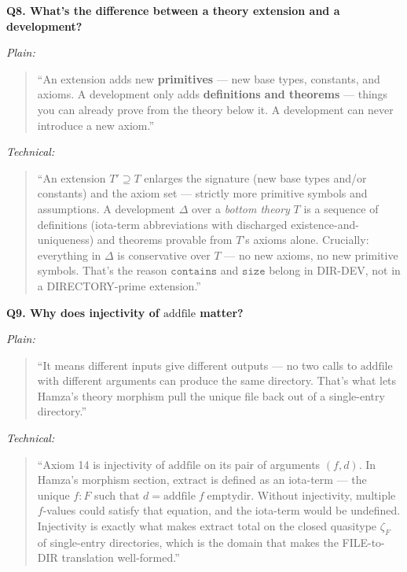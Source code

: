 \documentclass[12pt]{article}
\newenvironment{say}{%
  \par\medskip%
  \begin{quote}%
  \setlength{\parskip}{0.7em}%
  \large\itshape%
}{%
  \end{quote}%
  \medskip%
}
\begin{document}
\vspace{0.8em}
\textbf{\color{slidebar}Q8. What's the difference between a theory extension and a development?}

\textit{\color{pauseclr}Plain:}
\begin{say}
``An extension adds new \textbf{primitives} --- new base types, constants, and axioms. A development only adds \textbf{definitions and theorems} --- things you can already prove from the theory below it. A development can never introduce a new axiom.''
\end{say}

\textit{\color{pauseclr}Technical:}
\begin{say}
``An extension $T' \supseteq T$ enlarges the signature (new base types and/or constants) and the axiom set --- strictly more primitive symbols and assumptions. A development $\Delta$ over a \emph{bottom theory} $T$ is a sequence of definitions (iota-term abbreviations with discharged existence-and-uniqueness) and theorems provable from $T$'s axioms alone. Crucially: everything in $\Delta$ is conservative over $T$ --- no new axioms, no new primitive symbols. That's the reason $\mathtt{contains}$ and $\mathtt{size}$ belong in DIR-DEV, not in a DIRECTORY-prime extension.''
\end{say}

\vspace{0.8em}
\textbf{\color{slidebar}Q9. Why does injectivity of $\mathrm{addfile}$ matter?}

\textit{\color{pauseclr}Plain:}
\begin{say}
``It means different inputs give different outputs --- no two calls to $\mathrm{addfile}$ with different arguments can produce the same directory. That's what lets Hamza's theory morphism pull the unique file back out of a single-entry directory.''
\end{say}

\textit{\color{pauseclr}Technical:}
\begin{say}
``Axiom 14 is injectivity of $\mathrm{addfile}$ on its pair of arguments $(f, d)$. In Hamza's morphism section, $\mathrm{extract}$ is defined as an iota-term --- the unique $f : F$ such that $d = \mathrm{addfile}\; f\; \mathrm{emptydir}$. Without injectivity, multiple $f$-values could satisfy that equation, and the iota-term would be undefined. Injectivity is exactly what makes $\mathrm{extract}$ total on the closed quasitype $\zeta_F$ of single-entry directories, which is the domain that makes the FILE-to-DIR translation well-formed.''
\end{say}
\end{document}
